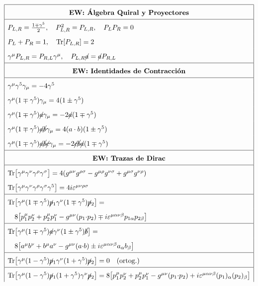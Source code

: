 $$\renewcommand{\arraystretch}{1.75}
\begin{array}{|l|}
\hline
\multicolumn{1}{|c|}{\textbf{EW: Álgebra Quiral y Proyectores}} \\
\hline
P_{L,R} = \tfrac{1\mp\gamma^5}{2},\quad P_{L,R}^2 = P_{L,R},\quad P_L P_R = 0 \\
P_L + P_R = 1,\quad \text{Tr}[P_{L,R}] = 2 \\
\gamma^\mu P_{L,R} = P_{R,L}\gamma^\mu,\quad P_{L,R}\cancel{a} = \cancel{a}P_{R,L} \\
\hline
\multicolumn{1}{|c|}{\textbf{EW: Identidades de Contracción}} \\
\hline
\gamma^\mu \gamma^5 \gamma_\mu = -4\gamma^5 \\
\gamma^\mu(1\mp\gamma^5)\gamma_\mu = 4(1\pm\gamma^5) \\
\gamma^\mu(1\mp\gamma^5)\cancel{a}\gamma_\mu = -2\cancel{a}(1\mp\gamma^5) \\
\gamma^\mu(1\mp\gamma^5)\cancel{a}\cancel{b}\gamma_\mu = 4(a\cdot b)(1\pm\gamma^5) \\
\gamma^\mu(1\mp\gamma^5)\cancel{a}\cancel{b}\cancel{c}\gamma_\mu = -2\cancel{c}\cancel{b}\cancel{a}(1\mp\gamma^5) \\
\hline
\multicolumn{1}{|c|}{\textbf{EW: Trazas de Dirac}} \\
\hline
\text{Tr}\big[\gamma^\mu\gamma^\nu\gamma^\rho\gamma^\sigma\big] = 4(g^{\mu\nu}g^{\rho\sigma} - g^{\mu\rho}g^{\nu\sigma} + g^{\mu\sigma}g^{\nu\rho}) \\
\text{Tr}\big[\gamma^\mu\gamma^\nu\gamma^\rho\gamma^\sigma\gamma^5\big] = 4i\varepsilon^{\mu\nu\rho\sigma} \\
\hline
\text{Tr}\big[\gamma^\mu(1\mp\gamma^5)\cancel{p}_1\gamma^\nu(1\mp\gamma^5)\cancel{p}_2\big] = \\
\quad 8\big[p_1^\mu p_2^\nu + p_2^\mu p_1^\nu - g^{\mu\nu}(p_1{\cdot}p_2) \mp i\varepsilon^{\mu\alpha\nu\beta}p_{1\alpha}p_{2\beta}\big] \\
\hline
\text{Tr}\big[\gamma^\mu(1\mp\gamma^5)\cancel{a}\gamma^\nu(1\pm\gamma^5)\cancel{b}\big] = \\
\quad 8\big[a^\mu b^\nu + b^\mu a^\nu - g^{\mu\nu}(a{\cdot}b) \pm i\varepsilon^{\mu\alpha\nu\beta}a_{\alpha}b_{\beta}\big] \\
\hline
\text{Tr}\big[\gamma^\mu(1-\gamma^5)\cancel{p}_1\gamma^\nu(1+\gamma^5)\cancel{p}_2\big] = 0 \quad (\text{ortog.}) \\
\hline
\text{Tr}\big[\gamma^\mu(1-\gamma^5)\cancel{p}_1 (1+\gamma^5)\gamma^\nu\cancel{p}_2\big] = 8\big[p_1^\mu p_2^\nu + p_2^\mu p_1^\nu - g^{\mu\nu}(p_1{\cdot}p_2) + i\varepsilon^{\mu\alpha\nu\beta}(p_1)_{\alpha}(p_2)_{\beta}\big] \\

\end{array}$$
